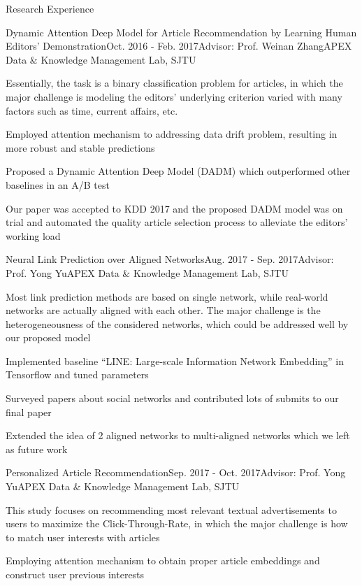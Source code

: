 \documentclass{resume} %
\begin{document}
\begin{rSection}{Research Experience}

\begin{rSubsection}{Dynamic Attention Deep Model for Article Recommendation
by Learning Human Editors’ Demonstration}{Oct. 2016 - Feb. 2017}{Advisor: Prof. Weinan Zhang}{APEX Data $\&$ Knowledge Management Lab, SJTU}  
\vspace{-3pt}
\item Essentially, the task is a binary classification problem for articles, in which the major challenge is modeling the editors' underlying criterion varied with many factors such as time, current affairs, etc.
\item Employed attention mechanism to addressing data drift problem, resulting in more robust and stable predictions
\item Proposed a Dynamic Attention Deep Model (DADM) which outperformed other baselines in an A/B test
\item Our paper was accepted to KDD 2017 and the proposed DADM model was on trial and automated the quality article selection process to alleviate the editors' working load
\end{rSubsection}

\begin{rSubsection}{Neural Link Prediction over Aligned Networks}{Aug. 2017 - Sep. 2017}{Advisor: Prof. Yong Yu}{APEX Data $\&$ Knowledge Management Lab, SJTU}
\item Most link prediction methods are based on single network, while real-world networks are actually aligned with each other. The major challenge is the heterogeneousness of the considered networks, which could be addressed well by our proposed model
\item Implemented baseline ``LINE: Large-scale Information Network Embedding'' in Tensorflow and tuned parameters
\item Surveyed papers about social networks and contributed lots of submits to our final paper
\item Extended the idea of 2 aligned networks to multi-aligned networks which we left as future work
\end{rSubsection}

\begin{rSubsection}{Personalized Article Recommendation}{Sep. 2017 - Oct. 2017}{Advisor: Prof. Yong Yu}{APEX Data $\&$ Knowledge Management Lab, SJTU}
\item This study focuses on recommending most relevant textual advertisements to users to maximize the Click-Through-Rate, in which the major challenge is how to match user interests with articles
\item Employing attention mechanism to obtain proper article embeddings and construct user previous interests
\end{rSubsection}

\end{rSection}
\end{document}

